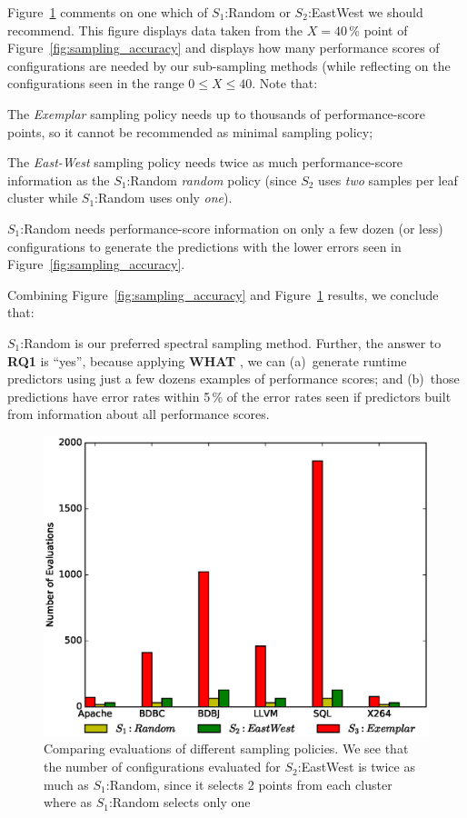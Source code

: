 \documentclass{sig-alternative}
\newcommand{\fig}[1]{Figure~\ref{fig:#1}}
\newcommand{\what}{{\bf WHAT }}
\begin{document}
\fig{Evaluations} comments on one which  of    $S_1$:Random or $S_2$:EastWest we should recommend.
This figure displays data taken from the $X=40$\,\% point of \fig{sampling_accuracy} and displays
how many performance scores of configurations are needed by our sub-sampling methods (while
reflecting on the configurations seen in the range $0\le X \le 40$. Note that:
\begin{compactitem}
\item
The {\em Exemplar} sampling policy needs up to thousands of performance-score points, 
so it cannot be recommended as minimal sampling policy;
\item The {\em East-West} sampling policy needs twice as much performance-score information as 
the $S_1$:Random {\em random} policy (since $S_2$ uses {\em two} samples per leaf cluster  while
$S_1$:Random uses only {\em one}).
\item $S_1$:Random needs performance-score information on only a few dozen (or less) configurations to generate
the predictions with the lower errors seen in \fig{sampling_accuracy}.
\end{compactitem}
Combining \fig{sampling_accuracy} and \fig{Evaluations} results, we conclude that:

\begin{myshadowbox}
$S_1$:Random is our preferred spectral sampling method. Further,
the answer to {\bf RQ1} is ``yes'', because applying \what, we can (a)~generate runtime predictors
using just a few dozens examples of performance scores; and (b)~those predictions have error rates
within 5\,\% of the error rates seen if predictors built from information about all performance scores.
\end{myshadowbox}

\begin{figure}[!t]
\includegraphics[width=0.9\linewidth]{Figures/evaluation_graph.eps}
\caption{ Comparing evaluations of different sampling policies. We see that the number of configurations evaluated for $S_2$:EastWest is twice as much as $S_1$:Random, since it selects 2 points from each cluster where as  $S_1$:Random selects only one }\label{fig:Evaluations}
\end{figure}
\end{document}
